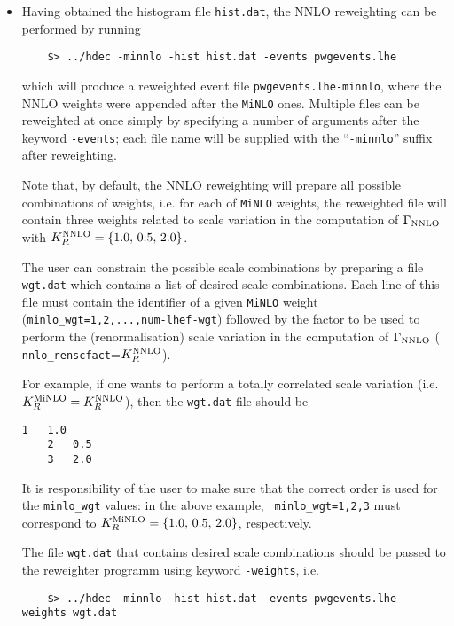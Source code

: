 \documentclass[11pt,a4paper]{article}\pdfoutput=1
\newcommand{\MINLO}{{\tt{MiNLO}}}
\begin{document}
\begin{itemize}
\item Having obtained the histogram file {\tt{hist.dat}}, the NNLO
  reweighting can be performed by running
  \begin{lstlisting}
    $> ../hdec -minnlo -hist hist.dat -events pwgevents.lhe
  \end{lstlisting}
  which will produce a reweighted event file
  {\tt{pwgevents.lhe-minnlo}}, where the NNLO weights were appended
  after the \MINLO{} ones. Multiple files can be reweighted at once
  simply by specifying a number of arguments after the keyword
  {\tt{-events}}; each file name will be supplied with the
  ``{\tt{-minnlo}}'' suffix after reweighting.

  Note that, by default, the NNLO reweighting will prepare all
  possible combinations of weights, i.e. for each of \MINLO{} weights,
  the reweighted file will contain three weights related to scale
  variation in the computation of $\Gamma_{\rm{NNLO}}$ with
  $K_R^{\rm{NNLO}}=\{1.0,\, 0.5,\, 2.0\}$.

  The user can constrain the possible scale combinations by preparing
  a file {\tt{wgt.dat}} which contains a list of desired scale
  combinations. Each line of this file must contain the identifier of
  a given \MINLO{} weight ({\tt minlo\_wgt=1,2,...,num-lhef-wgt})
  followed by the factor to be used to perform the (renormalisation)
  scale variation in the computation of $\Gamma_{\rm{NNLO}}$ ({\tt
    nnlo\_renscfact}=$K_R^{\rm{NNLO}}$).
  
  For example, if one wants to perform a totally correlated scale
  variation (i.e. $K_R^{\rm{MiNLO}}=K_R^{\rm{NNLO}}$), then the
  {\tt{wgt.dat}} file should be
  \begin{lstlisting}[basicstyle=\small\ttfamily\color{black}]
    1   1.0
    2   0.5
    3   2.0
  \end{lstlisting}
  It is responsibility of the user to make sure that the correct order
  is used for the {\tt minlo\_wgt} values: in the above example, {\tt
    minlo\_wgt=1,2,3} must correspond to $K_R^{\rm{MiNLO}}=\{1.0,\,
  0.5,\, 2.0\}$, respectively.

  The file {\tt{wgt.dat}} that contains desired scale combinations
  should be passed to the reweighter programm using keyword
  {\tt{-weights}}, i.e.
  \begin{lstlisting}
    $> ../hdec -minnlo -hist hist.dat -events pwgevents.lhe -weights wgt.dat
  \end{lstlisting}
\end{itemize}
\end{document}
